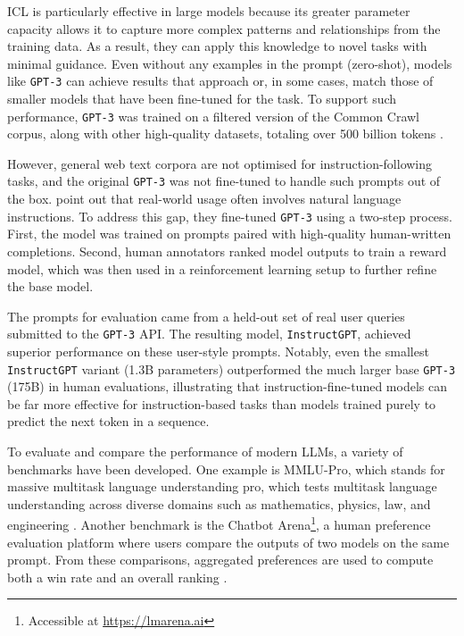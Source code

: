 \documentclass[a4paper,oneside,bibliography=totoc]{scrbook}
\begin{document}
\Ac{ICL} is particularly effective in large models because its greater parameter capacity allows it to capture more complex patterns and relationships from the training data. As a result, they can apply this knowledge to novel tasks with minimal guidance. Even without any examples in the prompt (zero-shot), models like \texttt{GPT-3} can achieve results that approach or, in some cases, match those of smaller models that have been fine-tuned for the task. To support such performance, \texttt{GPT-3} was trained on a filtered version of the Common Crawl corpus, along with other high-quality datasets, totaling over 500 billion tokens \cite{Brown2020}.

However, general web text corpora are not optimised for instruction-following tasks, and the original \texttt{GPT-3} was not fine-tuned to handle such prompts out of the box. \citet{Ouyang2022} point out that real-world usage often involves natural language instructions. To address this gap, they fine-tuned \texttt{GPT-3} using a two-step process. First, the model was trained on prompts paired with high-quality human-written completions. Second, human annotators ranked model outputs to train a reward model, which was then used in a reinforcement learning setup to further refine the base model.

The prompts for evaluation came from a held-out set of real user queries submitted to the \texttt{GPT-3} API. The resulting model, \texttt{InstructGPT}, achieved superior performance on these user-style prompts. Notably, even the smallest \texttt{InstructGPT} variant (1.3B parameters) outperformed the much larger base \texttt{GPT-3} (175B) in human evaluations, illustrating that instruction-fine-tuned models can be far more effective for instruction-based tasks than models trained purely to predict the next token in a sequence.

To evaluate and compare the performance of modern \acp{LLM}, a variety of benchmarks have been developed. One example is MMLU-Pro, which stands for massive multitask language understanding pro, which tests multitask language understanding across diverse domains such as mathematics, physics, law, and engineering \cite{Wang2024}. Another benchmark is the Chatbot Arena\footnote{Accessible at \url{https://lmarena.ai}}, a human preference evaluation platform where users compare the outputs of two models on the same prompt. From these comparisons, aggregated preferences are used to compute both a win rate and an overall ranking \cite{Chiang2024}.
\end{document}
